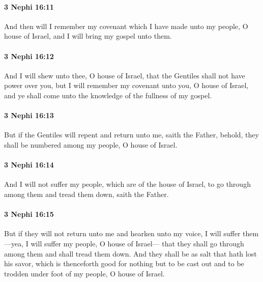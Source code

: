 		\paragraph{3 Nephi 16:11} %
			\label{3NEPHI-16-11}

			And then will I remember my covenant
			which I have made unto my people, O house of Israel,
			and I will bring my gospel unto them.

		\paragraph{3 Nephi 16:12} %
			\label{3NEPHI-16-12}

			And I will shew unto thee, O house of Israel,
			that the Gentiles shall not have power over you,
			but I will remember my covenant unto you, O house of Israel,
			and ye shall come unto the knowledge of the fullness of my gospel.

		\paragraph{3 Nephi 16:13} %
			\label{3NEPHI-16-13}

			But if the Gentiles will repent and return unto me, saith the Father,
			behold, they shall be numbered among my people, O house of Israel.

		\paragraph{3 Nephi 16:14} %
			\label{3NEPHI-16-14}

			And I will not suffer my people, which are of the house of Israel,
			to go through among them and tread them down, saith the Father.

		\paragraph{3 Nephi 16:15} %
			\label{3NEPHI-16-15}

			But if they will not return unto me and hearken unto my voice,
			I will suffer them---yea, I will suffer my people, O house of Israel---
			that they shall go through among them and shall tread them down.
			And they shall be as salt that hath lost his savor,
			which is thenceforth good for nothing but to be cast out
			and to be trodden under foot of my people, O house of Israel.


